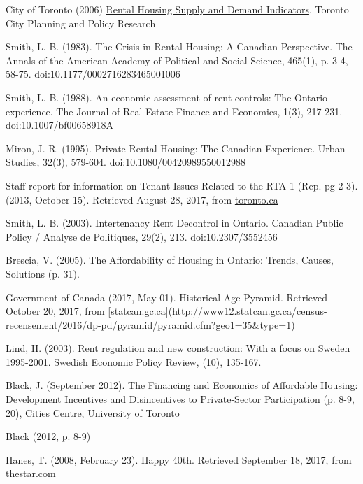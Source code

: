 \begin{thebibliography}{9}
  City of Toronto (2006) \href{https://www1.toronto.ca/city_of_toronto/social_development_finance__administration/files/pdf/housing_rental.pdf}{Rental Housing Supply and Demand Indicators}. Toronto City Planning and Policy Research

 Smith, L. B. (1983). The Crisis in Rental Housing: A Canadian Perspective. The Annals of the American Academy of Political and Social Science, 465(1), p. 3-4, 58-75. doi:10.1177/0002716283465001006

  Smith, L. B. (1988). An economic assessment of rent controls: The Ontario experience. The Journal of Real Estate Finance and Economics, 1(3), 217-231. doi:10.1007/bf00658918A

 Miron, J. R. (1995). Private Rental Housing: The Canadian Experience. Urban Studies, 32(3), 579-604. doi:10.1080/00420989550012988

  Staff report for information on Tenant Issues Related to the RTA 1 (Rep. pg 2-3). (2013, October 15). Retrieved August 28, 2017, from \href{http://www.toronto.ca/legdocs/mmis/2013/ex/bgrd/backgroundfile-63467.pdf}{toronto.ca}

 Smith, L. B. (2003). Intertenancy Rent Decontrol in Ontario. Canadian Public Policy / Analyse de Politiques, 29(2), 213. doi:10.2307/3552456

 Brescia, V. (2005). The Affordability of Housing in Ontario: Trends, Causes, Solutions (p. 31).

Government of Canada (2017, May 01). Historical Age Pyramid. Retrieved October 20, 2017, from [statcan.gc.ca](http://www12.statcan.gc.ca/census-recensement/2016/dp-pd/pyramid/pyramid.cfm?geo1=35\&type=1)

Lind, H. (2003). Rent regulation and new construction: With a focus on Sweden 1995-2001. Swedish Economic Policy Review, (10), 135-167.

 Black, J. (September 2012). The Financing and Economics of Affordable Housing: Development Incentives and Disincentives to Private-Sector Participation (p. 8-9, 20), Cities Centre, University of Toronto

 Black (2012, p. 8-9)

  Hanes, T. (2008, February 23). Happy 40th. Retrieved September 18, 2017, from \href{https://www.thestar.com/news/2008/02/23/happy_40th.html}{thestar.com}


\end{thebibliography}
